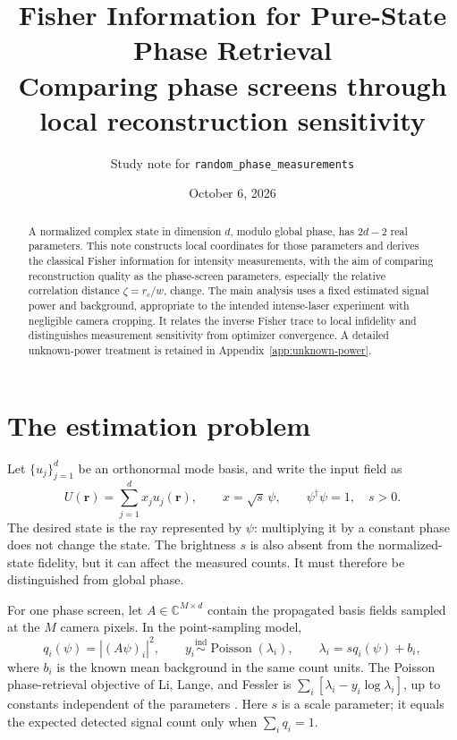 \documentclass[11pt,a4paper]{article}
\title{Fisher Information for Pure-State Phase Retrieval\\\large Comparing phase screens through local reconstruction sensitivity}
\author{Study note for \texttt{random\_phase\_measurements}}
\date{October 6, 2026}
\newcommand{\C}{\mathbb C}
\begin{document}
\maketitle

\begin{abstract}
A normalized complex state in dimension $d$, modulo global phase, has
$2d-2$ real parameters. This note constructs local coordinates for those
parameters and derives the classical Fisher information for intensity
measurements, with the aim of comparing reconstruction quality as the
phase-screen parameters, especially the relative correlation distance $\zeta=r_c/w$, change.
The main analysis uses a fixed estimated signal power and background,
appropriate to the intended intense-laser experiment with negligible camera
cropping. It relates the inverse Fisher trace to local infidelity and
distinguishes measurement sensitivity from optimizer convergence. A detailed
unknown-power treatment is retained in Appendix~\ref{app:unknown-power}.
\end{abstract}

\section{The estimation problem}
Let $\{u_j\}_{j=1}^d$ be an orthonormal mode basis, and write the input field as
\begin{equation}
 U(\mathbf r)=\sum_{j=1}^d x_j u_j(\mathbf r),\qquad
 x=\sqrt{s}\,\psi,\qquad \psi^\dagger\psi=1,\quad s>0.
\end{equation}
The desired state is the ray represented by $\psi$: multiplying it by a
constant phase does not change the state. The brightness $s$ is also absent
from the normalized-state fidelity, but it can affect the measured counts.
It must therefore be distinguished from global phase.

For one phase screen, let $A\in\C^{M\times d}$ contain the propagated basis
fields sampled at the $M$ camera pixels. In the point-sampling model,
\begin{equation}
 q_i(\psi)=|(A\psi)_i|^2,\qquad
 y_i\overset{\mathrm{ind}}\sim\operatorname{Poisson}(\lambda_i),\qquad
 \lambda_i=sq_i(\psi)+b_i, \label{eq:model}
\end{equation}
where $b_i$ is the known mean background in the same count units.
The Poisson phase-retrieval objective of Li, Lange, and Fessler is
$\sum_i[\lambda_i-y_i\log\lambda_i]$, up to constants independent of the
parameters \cite{li2022}. Here $s$ is a scale parameter; it equals the
expected detected signal count only when $\sum_iq_i=1$.
\end{document}
